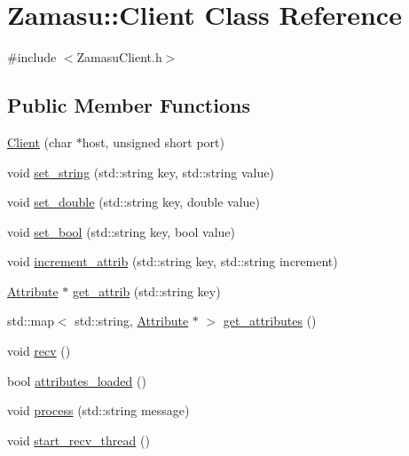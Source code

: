 \hypertarget{class_zamasu_1_1_client}{}\section{Zamasu\+:\+:Client Class Reference}
\label{class_zamasu_1_1_client}


{\ttfamily \#include $<$Zamasu\+Client.\+h$>$}

\subsection*{Public Member Functions}
\begin{DoxyCompactItemize}
\item 
\hyperlink{class_zamasu_1_1_client_a803e67f82c5fd8ead17b889d4e2f2edd}{Client} (char $\ast$host, unsigned short port)
\item 
void \hyperlink{class_zamasu_1_1_client_a7ab2083dcc34e69588340baa3079ea94}{set\+\_\+string} (std\+::string key, std\+::string value)
\item 
void \hyperlink{class_zamasu_1_1_client_a8759b38867399148a6e4b1d0d981a1aa}{set\+\_\+double} (std\+::string key, double value)
\item 
void \hyperlink{class_zamasu_1_1_client_ae8cfb0aec0e79b6f867d3ab1313740df}{set\+\_\+bool} (std\+::string key, bool value)
\item 
void \hyperlink{class_zamasu_1_1_client_a97cc80c21d140e67c81b8fc7ad1c943f}{increment\+\_\+attrib} (std\+::string key, std\+::string increment)
\item 
\hyperlink{class_zamasu_1_1_attribute}{Attribute} $\ast$ \hyperlink{class_zamasu_1_1_client_aa3af07c782de29f6184f2251cad4bf57}{get\+\_\+attrib} (std\+::string key)
\item 
std\+::map$<$ std\+::string, \hyperlink{class_zamasu_1_1_attribute}{Attribute} $\ast$ $>$ \hyperlink{class_zamasu_1_1_client_a945c68518c6c20f36d3039424aaa548c}{get\+\_\+attributes} ()
\item 
void \hyperlink{class_zamasu_1_1_client_a9145ad0948f4016beb356e6905c41a6e}{recv} ()
\item 
bool \hyperlink{class_zamasu_1_1_client_ab32e2797b70ff01ee20e68da1f8538a7}{attributes\+\_\+loaded} ()
\item 
void \hyperlink{class_zamasu_1_1_client_a2e22bcc53130b02e29c571e41dc88e26}{process} (std\+::string message)
\item 
void \hyperlink{class_zamasu_1_1_client_afca4246ebc27a3b94bf32b429464657c}{start\+\_\+recv\+\_\+thread} ()
\end{DoxyCompactItemize}
